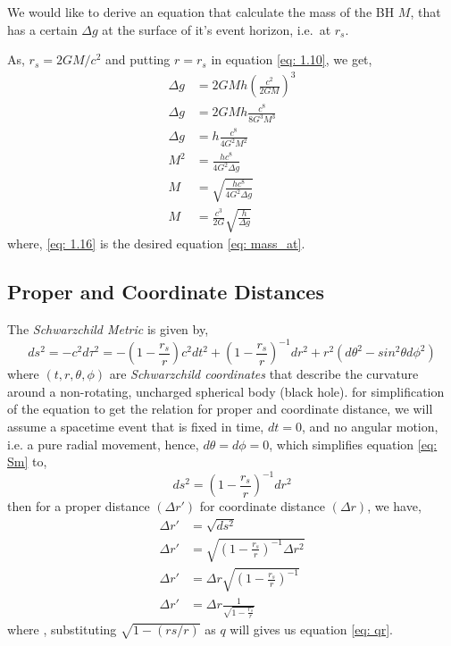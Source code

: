 We would like to derive an equation that calculate the mass of the BH \(M\), that has a certain \(\Delta g\) at the surface of it's event horizon, i.e.~at \(r_s\). 

As, \(r_s = 2GM/c^2 \) and putting \(r = r_s\) in equation \eqref{eq: 1.10}, we get, 
\begin{align} \label{eq: 1.16}
\Delta g &= 2GMh (\frac{c^2}{2GM})^3 \tag{1.11} \\
\Delta g &= 2GMh \frac{c^8}{8G^3 M^3} \tag{1.12} \\
\Delta g &= h \frac{c^8}{4G^2 M^2} \tag{1.13} \\
    M^2 &=  \frac{hc^8}{4G^2 \Delta g} \tag{1.14} \\
    M &= \sqrt{\frac{hc^8}{4G^2 \Delta g} \tag{1.15}} \\
    M &= \frac{c^3}{2G}\sqrt{\frac{h}{\Delta g} \tag{1.16}}  
\end{align}
where, \eqref{eq: 1.16} is the desired equation \eqref{eq: mass_at}.

\subsection*{Proper and Coordinate Distances}

The \emph{Schwarzchild Metric} is given by, 
\begin{equation} \label{eq: Sm}
ds^2 = -c^2d\tau^2 = -(1 - \frac{r_s}{r}) c^2 dt^2 + (1 - \frac{r_s}{r})^{-1} dr^2 + r^2 (d\theta^2 - sin^2\theta d\phi^2) \tag{2.1}
\end{equation}
where \((t, r, \theta, \phi)\) are \emph{Schwarzchild coordinates} that describe the curvature around a non-rotating, uncharged spherical body (black hole). 
for simplification of the equation to get the relation for proper and coordinate distance, we will assume a spacetime event that is fixed in time, \(dt = 0\), and no angular motion, i.e. a pure radial movement, hence, \(d\theta = d\phi = 0\), which simplifies equation \eqref{eq: Sm} to, 
\begin{equation} \label{eq: 2.2}
ds^2 = (1 - \frac{r_s}{r})^{-1} dr^2 \tag{2.2}
\end{equation}
then for a proper distance \((\Delta r')\) for coordinate distance \((\Delta r)\), we have, 
\begin{align*} \label{eq:2.3}
\Delta r' &= \sqrt{ds^2}  \\
\Delta r' &= \sqrt{(1- \frac{r_s}{r})^{-1} \Delta r^2}  \\
\Delta r' &= \Delta r \sqrt{(1 - \frac{r_s}{r})^{-1}} \\
\Delta r' &= \Delta r \frac{1}{\sqrt{1- \frac{r_s}{r}}} \tag{2.3} 
\end{align*}
where , substituting \(\sqrt{1 - (rs/r)}\) as \(q\) will gives us equation \eqref{eq: qr}. 

